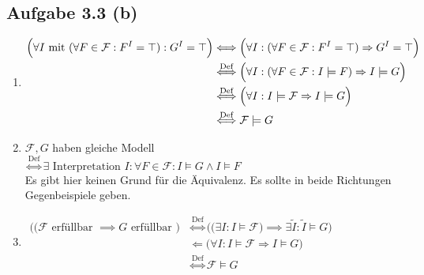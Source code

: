 \documentclass[12pt,a4paper]{article}
\newcommand{\F}{\mathcal{F}}
\begin{document}
\subsection*{Aufgabe 3.3 (b)}
\begin{enumerate}[label=(\arabic*)]
\item $\begin{aligned}
\Big(\forall I\mit (\forall F\in\F:F^I=\top):G^I=\top\Big)
&\Longleftrightarrow
\Big(\forall I:(\forall F\in\F:F^I=\top)\Rightarrow G^I=\top\Big)\\
&\stackrel{\text{Def}}{\Longleftrightarrow}
\Big(\forall I:(\forall F\in\F:I\models F)\Rightarrow I\models G\Big)\\
&\stackrel{\text{Def}}{\Longleftrightarrow}
\Big(\forall I:I\models\F\Rightarrow I\models G\Big)\\
&\stackrel{\text{Def}}{\Longleftrightarrow}
\F\models G
\end{aligned}$
\item $\F,G$ haben gleiche Modell\\
$\stackrel{\text{Def}}{\Longleftrightarrow}
\exists\text{ Interpretation } I:\forall F\in\F:I\models G\wedge I\models F$\\

Es gibt hier keinen Grund für die Äquivalenz. Es sollte in beide Richtungen Gegenbeispiele geben.
\item $\begin{aligned} 
\Big(\big(\F\text{ erfüllbar }\implies G\text{ erfüllbar }\big)
&\stackrel{\text{Def}}{\Longleftrightarrow}
\Big(\big(\exists I:I\models\F\big)\implies\exists\tilde{I}:\tilde{I}\models G\Big)\\
&\Longleftarrow
\Big(\forall I:I\models\F\Rightarrow I\models G\Big)\\
&\stackrel{\text{Def}}{\Longleftrightarrow}
\F\models G
\end{aligned}$\\


\end{enumerate}
\end{document}

